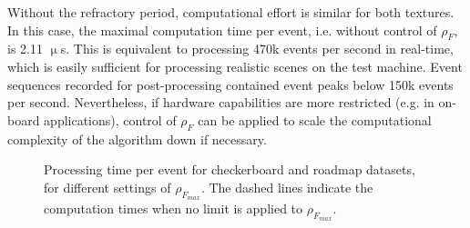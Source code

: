 Without the refractory period, computational effort is similar for both textures. In this case, the maximal computation time per event, i.e. without control of $\rho_F$, is 2.11 $\upmu$s. This is equivalent to processing 470k events per second in real-time, which is easily sufficient for processing realistic scenes on the test machine. Event sequences recorded for post-processing contained event peaks below 150k events per second. Nevertheless, if hardware capabilities are more restricted (e.g. in on-board applications), control of $\rho_F$ can be applied to scale the computational complexity of the algorithm down if necessary.

\begin{figure}[h]
	\centering
	\setlength{\fwidth}{0.5\linewidth}
	\renewcommand{\xlabeldist}{-0.05}
	
	\caption{Processing time per event for checkerboard and roadmap datasets, for different settings of $\rho_{F_{max}}$. The dashed lines indicate the computation times when no limit is applied to $\rho_{F_{max}}$.}
	\label{fig:timing_rate_control}
\end{figure}



